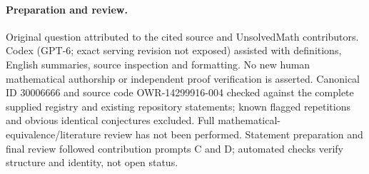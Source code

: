\documentclass[11pt]{article}
\begin{document}
\paragraph{Preparation and review.}
Original question attributed to the cited source and UnsolvedMath contributors. Codex (GPT-6; exact serving revision not exposed) assisted with definitions, English summaries, source inspection and formatting. No new human mathematical authorship or independent proof verification is asserted. Canonical ID 30006666 and source code OWR-14299916-004 checked against the complete supplied registry and existing repository statements; known flagged repetitions and obvious identical conjectures excluded. Full mathematical-equivalence/literature review has not been performed. Statement preparation and final review followed contribution prompts C and D; automated checks verify structure and identity, not open status.
\label{end:30006666}
\end{document}
